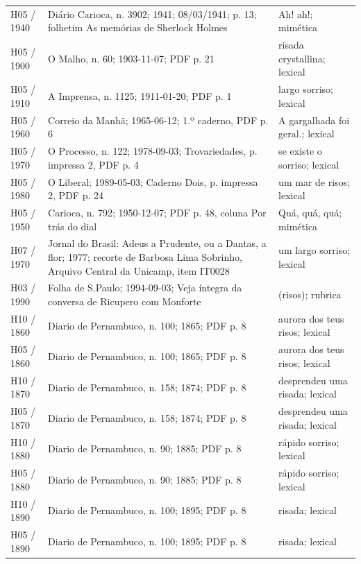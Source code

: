 \begin{longtable}{>{\raggedright\arraybackslash}p{}>{\raggedright\arraybackslash}p{}>{\raggedright\arraybackslash}p{}}
H05 / 1940 & Diário Carioca, n. 3902; 1941; 08/03/1941; p. 13; folhetim As memórias de Sherlock Holmes & Ah! ah!; mimética \cite{carioca1941} \\
H05 / 1900 & O Malho, n. 60; 1903-11-07; PDF p. 21 & risada crystallina; lexical \cite{acervoD030} \\
H05 / 1910 & A Imprensa, n. 1125; 1911-01-20; PDF p. 1 & largo sorriso; lexical \cite{acervoD031} \\
H05 / 1960 & Correio da Manhã; 1965-06-12; 1.º caderno, PDF p. 6 & A gargalhada foi geral.; lexical \cite{acervoD032} \\
H05 / 1970 & O Processo, n. 122; 1978-09-03; Trovariedades, p. impressa 2, PDF p. 4 & se existe o sorriso; lexical \cite{acervoD033} \\
H05 / 1980 & O Liberal; 1989-05-03; Caderno Dois, p. impressa 2, PDF p. 24 & um mar de risos; lexical \cite{acervoD034} \\
H05 / 1950 & Carioca, n. 792; 1950-12-07; PDF p. 48, coluna Por trás do dial & Quá, quá, quá; mimética \cite{anual1950} \\
H07 / 1970 & Jornal do Brasil: Adeus a Prudente, ou a Dantas, a flor; 1977; recorte de Barbosa Lima Sobrinho, Arquivo Central da Unicamp, item IT0028 & um largo sorriso; lexical \cite{acervoD036} \\
H03 / 1990 & Folha de S.Paulo; 1994-09-03; Veja íntegra da conversa de Ricupero com Monforte & (risos); rubrica \cite{folha1994} \\
H10 / 1860 & Diario de Pernambuco, n. 100; 1865; PDF p. 8 & aurora dos teus risos; lexical \cite{acervoD038} \\
H05 / 1860 & Diario de Pernambuco, n. 100; 1865; PDF p. 8 & aurora dos teus risos; lexical \cite{acervoD038} \\
H10 / 1870 & Diario de Pernambuco, n. 158; 1874; PDF p. 8 & desprendeu uma risada; lexical \cite{acervoD040} \\
H05 / 1870 & Diario de Pernambuco, n. 158; 1874; PDF p. 8 & desprendeu uma risada; lexical \cite{acervoD040} \\
H10 / 1880 & Diario de Pernambuco, n. 90; 1885; PDF p. 8 & rápido sorriso; lexical \cite{acervoD042} \\
H05 / 1880 & Diario de Pernambuco, n. 90; 1885; PDF p. 8 & rápido sorriso; lexical \cite{acervoD042} \\
H10 / 1890 & Diario de Pernambuco, n. 100; 1895; PDF p. 8 & risada; lexical \cite{acervoD044} \\
H05 / 1890 & Diario de Pernambuco, n. 100; 1895; PDF p. 8 & risada; lexical \cite{acervoD044} \\

\end{longtable}
